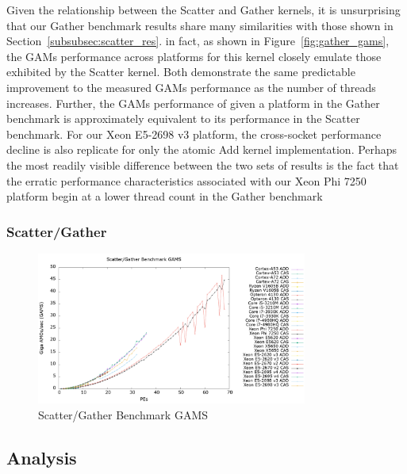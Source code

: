 Given the relationship between the Scatter and Gather kernels, it is unsurprising that our Gather benchmark results share many similarities with those shown in Section~\ref{subsubsec:scatter_res}.
in fact, as shown in Figure~\ref{fig:gather_gams}, the GAMs performance across platforms for this kernel closely emulate those exhibited by the Scatter kernel.
Both demonstrate the same predictable improvement to the measured GAMs performance as the number of threads increases.
Further, the GAMs performance of given a platform in the Gather benchmark is approximately equivalent to its performance in the Scatter benchmark.
For our Xeon E5-2698 v3 platform, the cross-socket performance decline is also replicate for only the atomic Add kernel implementation. 
Perhaps the most readily visible difference between the two sets of results is the fact that the erratic performance characteristics associated with our Xeon Phi 7250 platform begin at a lower thread count in the Gather benchmark

\subsubsection{Scatter/Gather}
\label{subsubsec:sg_res}

\begin{figure}[!t]
\centering
\includegraphics[width=3.5in]{figures/SG_GAMS.png}
\caption{Scatter/Gather Benchmark GAMS}
\label{fig:sg_gams}
\end{figure}

\subsection{Analysis}
\label{subsec:analysis}

